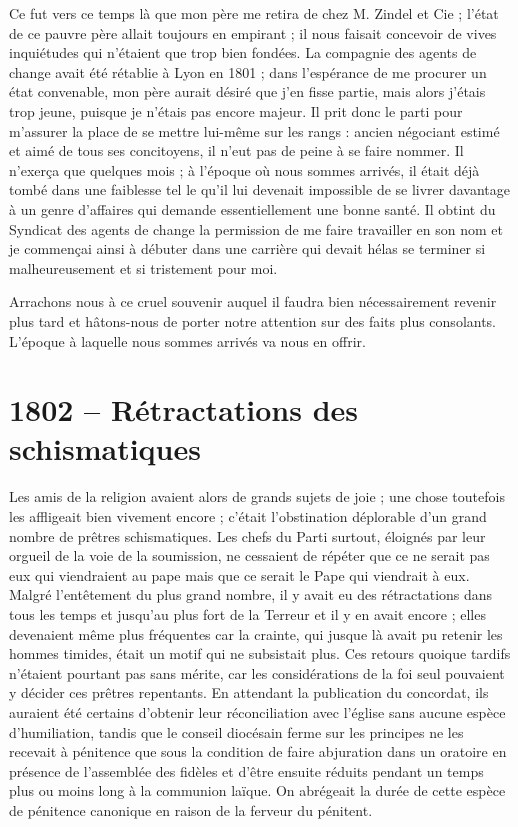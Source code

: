 \documentclass[11pt,a4paper]{report}
\begin{document}
Ce fut vers ce temps là que mon père me retira de chez M. Zindel et Cie ; l'état de ce pauvre père allait toujours en empirant ; il nous faisait concevoir de vives inquiétudes qui n'étaient que trop bien fondées. La compagnie des agents de change avait été rétablie à Lyon en 1801 ; dans l'espérance de me procurer un état convenable, mon père aurait désiré que j'en fisse partie, mais alors j'étais trop jeune, puisque je n'étais pas encore majeur. Il prit donc le parti pour m'assurer la place de se mettre lui-même sur les rangs : ancien négociant estimé et aimé de tous ses concitoyens, il n'eut pas de peine à se faire nommer. Il n'exerça que quelques mois ; à l'époque où nous sommes arrivés, il était déjà tombé dans une faiblesse tel le qu'il lui devenait impossible de se livrer davantage à un genre d'affaires qui demande essentiellement une bonne santé. Il obtint du Syndicat des agents de change la permission de me faire travailler en son nom et je commençai ainsi à débuter dans une carrière qui devait hélas se terminer si malheureusement et si tristement pour moi.

Arrachons nous à ce cruel souvenir auquel il faudra bien nécessairement revenir plus tard et hâtons-nous de porter notre attention sur des faits plus consolants. L'époque à laquelle nous sommes arrivés va nous en offrir.

\section*{1802 -- Rétractations des schismatiques}

Les amis de la religion avaient alors de grands sujets de joie ; une chose toutefois les affligeait bien vivement encore ; c'était l'obstination déplorable d'un grand nombre de prêtres schismatiques. Les chefs du Parti surtout, éloignés par leur orgueil de la voie de la soumission, ne cessaient de répéter que ce ne serait pas eux qui viendraient au pape mais que ce serait le Pape qui viendrait à eux. Malgré l'entêtement du plus grand nombre, il y avait eu des rétractations dans tous les temps et jusqu'au plus fort de la Terreur et il y en avait encore ; elles devenaient même plus fréquentes car la crainte, qui jusque là avait pu retenir les hommes timides, était un motif qui ne subsistait plus. Ces retours quoique tardifs n'étaient pourtant pas sans mérite, car les considérations de la foi seul pouvaient y décider ces prêtres repentants. En attendant la publication du concordat, ils auraient été certains d'obtenir leur réconciliation avec l'église sans aucune espèce d'humiliation, tandis que le conseil diocésain ferme sur les principes ne les recevait à pénitence que sous la condition de faire abjuration dans un oratoire en présence de l'assemblée des fidèles et d'être ensuite réduits pendant un temps plus ou moins long à la communion laïque. On abrégeait la durée de cette espèce de pénitence canonique en raison de la ferveur du pénitent.
\end{document}
